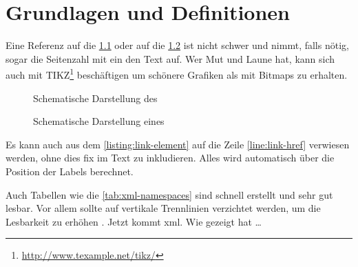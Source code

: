 
\chapter{Grundlagen und Definitionen}
\label{chap:GrundlagenDefinitionen}
\blindtext

Eine Referenz auf die \cref{fig:wot} oder auf die \cref{fig:ht} ist nicht schwer und nimmt, falls nötig, sogar die Seitenzahl mit ein den Text auf. Wer Mut und
Laune hat, kann sich auch mit TIKZ\footnote{\url{http://www.texample.net/tikz/}} beschäftigen um schönere Grafiken als mit Bitmaps zu erhalten.

\begin{figure}
\centering

\caption{Schematische Darstellung des }
\label{fig:wot}
\end{figure}


\begin{figure}
\centering
\begin{sideways}

\end{sideways}
\caption{Schematische Darstellung eines }
\label{fig:ht}
\end{figure}

Es kann auch aus dem \cref{listing:link-element} auf die Zeile \ref{line:link-href} verwiesen werden, ohne dies fix im Text zu inkludieren. Alles wird automatisch über die
Position der Labels berechnet.



Auch Tabellen wie die \cref{tab:xml-namespaces} sind schnell erstellt und sehr gut lesbar. Vor allem sollte auf vertikale Trennlinien verzichtet werden, um die
Lesbarkeit zu erhöhen \cite{latex}. Jetzt kommt \gls{xml}. Wie  gezeigt hat \ldots

